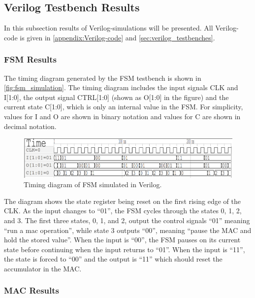 \subsection{Verilog Testbench Results}

In this subsection results of Verilog-simulations will be presented. All Verilog-code is given in \autoref{appendix:Verilog-code} and \ref{sec:verilog_testbenches}.

\subsubsection{FSM Results}
\label{subsubsec:fsm_results}

\noindent
The timing diagram generated by the FSM testbench is shown in \autoref{fig:fsm_simulation}. The timing diagram includes the input signals CLK and I[1:0], the output signal CTRL[1:0] (shown as O[1:0] in the figure) and the current state C[1:0], which is only an internal value in the FSM. For simplicity, values for I and O are shown in binary notation and values for C are shown in decimal notation.

\begin{figure}[H]
    \centering
    \includegraphics[width=\textwidth]{Figures/FSM_testbench_out.png}
    \caption{Timing diagram of FSM simulated in Verilog.}
    \label{fig:fsm_simulation}
\end{figure}

The diagram shows the state register being reset on the first rising edge of the CLK. As the input changes to ``01'', the FSM cycles through the states 0, 1, 2, and 3. The first three states, 0, 1, and 2, output the control signals ``01'' meaning ``run a mac operation'', while state 3 outputs ``00'', meaning ``pause the MAC and hold the stored value''. When the input is ``00'', the FSM pauses on its current state before continuing when the input returns to ``01''. When the input is ``11'', the state is forced to ``00'' and the output is ``11'' which should reset the accumulator in the MAC.

\subsubsection{MAC Results}
\label{subsubsec:mac_results}

